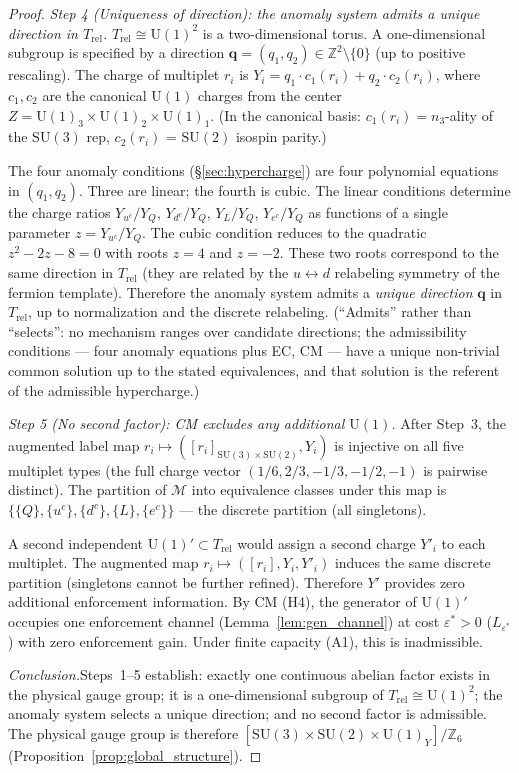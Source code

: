\documentclass[11pt,a4paper]{article}
\theoremstyle{definition}
\newcommand{\SU}{\mathrm{SU}}
\newcommand{\U}{\mathrm{U}}
\begin{document}
\begin{proof}
\textit{Step 4 (Uniqueness of direction): the anomaly system
admits a unique direction in $T_{\mathrm{rel}}$.}\quad
$T_{\mathrm{rel}} \cong \mathrm{U}(1)^2$ is a two-dimensional torus.
A one-dimensional subgroup is specified by a direction
$\mathbf{q} = (q_1, q_2) \in \mathbb{Z}^2 \setminus \{0\}$ (up to
positive rescaling).  The charge of multiplet $r_i$ is
$Y_i = q_1 \cdot c_1(r_i) + q_2 \cdot c_2(r_i)$, where
$c_1, c_2$ are the canonical $\mathrm{U}(1)$ charges from the
center $Z = \mathrm{U}(1)_3 \times \mathrm{U}(1)_2 \times
\mathrm{U}(1)_1$.  (In the canonical basis:
$c_1(r_i) = n_3$-ality of the $\SU(3)$ rep, $c_2(r_i)$ =
$\SU(2)$ isospin parity.)

The four anomaly conditions (\S\ref{sec:hypercharge}) are four
polynomial equations in $(q_1, q_2)$.  Three are linear; the
fourth is cubic.  The linear conditions determine the charge
ratios $Y_{u^c}/Y_Q$, $Y_{d^c}/Y_Q$, $Y_L/Y_Q$, $Y_{e^c}/Y_Q$
as functions of a single parameter $z = Y_{u^c}/Y_Q$.  The cubic
condition reduces to the quadratic $z^2 - 2z - 8 = 0$ with roots
$z = 4$ and $z = -2$.  These two roots correspond to the same
direction in $T_{\mathrm{rel}}$ (they are related by the
$u \leftrightarrow d$ relabeling symmetry of the fermion template).
Therefore the anomaly system admits a \emph{unique direction}
$\mathbf{q}$ in $T_{\mathrm{rel}}$, up to normalization and the
discrete relabeling.  (``Admits'' rather than ``selects'': no
mechanism ranges over candidate directions; the admissibility
conditions --- four anomaly equations plus EC, CM --- have a unique
non-trivial common solution up to the stated equivalences, and
that solution is the referent of the admissible hypercharge.)

\textit{Step 5 (No second factor): CM excludes any additional
$\U(1)$.}\quad
After Step~3, the augmented label map
$r_i \mapsto ([r_i]_{\SU(3) \times \SU(2)}, Y_i)$ is injective on
all five multiplet types (the full charge vector
$(1/6, 2/3, -1/3, -1/2, -1)$ is pairwise distinct).  The partition of
$\mathcal{M}$ into equivalence classes under this map is
$\{\{Q\}, \{u^c\}, \{d^c\}, \{L\}, \{e^c\}\}$ --- the discrete
partition (all singletons).

A second independent $\U(1)' \subset T_{\mathrm{rel}}$ would assign
a second charge $Y'_i$ to each multiplet.  The augmented map
$r_i \mapsto ([r_i], Y_i, Y'_i)$ induces the same discrete
partition (singletons cannot be further refined).  Therefore $Y'$
provides zero additional enforcement information.  By CM (H4), the
generator of $\U(1)'$ occupies one enforcement channel
(Lemma~\ref{lem:gen_channel}) at cost $\varepsilon^* > 0$
($L_{\varepsilon^*}$) with zero enforcement gain.  Under finite
capacity (A1), this is inadmissible.

\textit{Conclusion.}\quad Steps~1--5 establish: exactly one
continuous abelian factor exists in the physical gauge group; it is a
one-dimensional subgroup of $T_{\mathrm{rel}} \cong \mathrm{U}(1)^2$;
the anomaly system selects a unique direction; and no second factor is
admissible.  The physical gauge group is therefore
$[\SU(3) \times \SU(2) \times \U(1)_Y] / \mathbb{Z}_6$
(Proposition~\ref{prop:global_structure}).
\end{proof}
\end{document}
